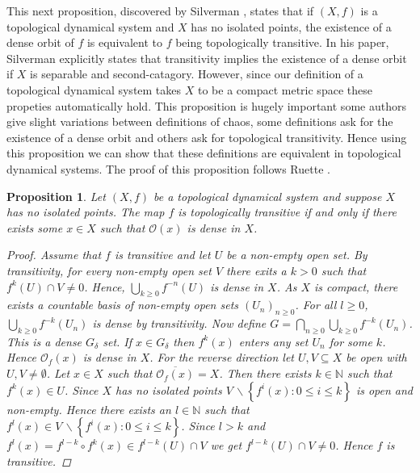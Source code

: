 \documentclass[11pt,a4paper,oneside]{memoir}
\theoremstyle{plain}
\newtheorem{prop}[thm]{Proposition}
\theoremstyle{definition}
\begin{document}
This next proposition, discovered by Silverman \cite{silverman}, states that if $(X, f)$ is a topological dynamical system and $X$ has no isolated points, the existence of a dense orbit of $f$ is equivalent to $f$ being topologically transitive. In his paper, Silverman explicitly states that transitivity implies the existence of a dense orbit if $X$ is separable and second-catagory. However, since our definition of a topological dynamical system takes $X$ to be a compact metric space these propeties automatically hold. This proposition is hugely important some authors give slight variations between definitions of chaos, some definitions ask for the existence of a dense orbit and others ask for topological transitivity. Hence using this proposition we can show that these definitions are equivalent in topological dynamical systems. The proof of this proposition follows Ruette \cite[Section 2.1]{ruette}.

\begin{prop} \label{prop:dense-transitive}
    Let $(X, f)$ be a topological dynamical system and suppose $X$ has no isolated points. The map $f$ is topologically transitive if and only if there exists some $x \in X$ such that $\mathcal{O}(x)$ is dense in $X$.
    \begin{proof}
        Assume that $f$ is transitive and let $U$ be a non-empty open set. By transitivity, for every non-empty open set $V$ there exits a $k > 0$ such that $f^k(U) \cap V \neq 0$. Hence, $\bigcup_{k \geq 0}f^{-n}(U)$ is dense in $X$. As $X$ is compact, there exists a countable basis of non-empty open sets $(U_n)_{n \geq 0}$. For all $l \geq 0$, $\bigcup_{k \geq 0}f^{-k}(U_n)$ is dense by transitivity. Now define $G = \bigcap_{n \geq 0}\bigcup_{k \geq 0}f^{-k}(U_n)$. This is a dense $G_\delta$ set. If $x \in G_\delta$ then $f^k(x)$ enters any set $U_n$ for some $k$. Hence $\mathcal{O}_f(x)$ is dense in $X$. For the reverse direction let $U, V \subseteq X$ be open with $U, V \neq \emptyset$. Let $x \in X$ such that $\overline{\mathcal{O}_f(x)} = X$. Then there exists $k \in \mathbb{N}$ such that $f^k(x) \in U$. Since $X$ has no isolated points $V\, \backslash \left\lbrace f^i(x) : 0 \leq i \leq k \right\rbrace$ is open and non-empty. Hence there exists an $l \in \mathbb{N}$ such that $f^l(x) \in V\, \backslash \left\lbrace f^i(x) : 0 \leq i \leq k \right\rbrace$. Since $l > k$ and $f^l(x) = f^{l - k} \circ f^{k}(x) \in f^{l - k}(U) \cap V$ we get $f^{l - k}(U) \cap V \neq 0$. Hence $f$ is transitive.
    \end{proof}
\end{prop}
\end{document}
